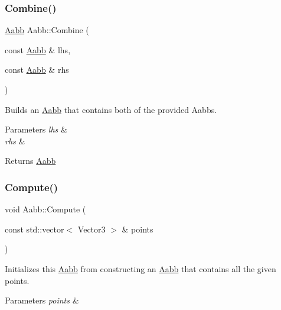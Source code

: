 \subsubsection{\texorpdfstring{Combine()}{Combine()}}
{\footnotesize\ttfamily \hyperlink{classAabb}{Aabb} Aabb\+::\+Combine (\begin{DoxyParamCaption}\item[{const \hyperlink{classAabb}{Aabb} \&}]{lhs,  }\item[{const \hyperlink{classAabb}{Aabb} \&}]{rhs }\end{DoxyParamCaption})\hspace{0.3cm}{\ttfamily [static]}}



Builds an \hyperlink{classAabb}{Aabb} that contains both of the provided Aabbs. 


\begin{DoxyParams}{Parameters}
{\em lhs} & \\
\hline
{\em rhs} & \\
\hline
\end{DoxyParams}
\begin{DoxyReturn}{Returns}
\hyperlink{classAabb}{Aabb} 
\end{DoxyReturn}
\mbox{\label{classAabb_a57f19da16237a3e73ba246bd9a20cb9f}} 
\subsubsection{\texorpdfstring{Compute()}{Compute()}}
{\footnotesize\ttfamily void Aabb\+::\+Compute (\begin{DoxyParamCaption}\item[{const std\+::vector$<$ Vector3 $>$ \&}]{points }\end{DoxyParamCaption})}



Initializes this \hyperlink{classAabb}{Aabb} from constructing an \hyperlink{classAabb}{Aabb} that contains all the given points. 


\begin{DoxyParams}{Parameters}
{\em points} & \\
\hline
\end{DoxyParams}
\mbox{\label{classAabb_ac3cca862f5ccbdf7e3aed736476fd9ea}} 
